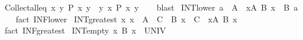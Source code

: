 \begin{isabellebody}
\isamarkupfalse%
\ Collect{\isacharunderscore}{\kern0pt}all{\isacharunderscore}{\kern0pt}eq{\isacharcolon}{\kern0pt}\ {\isachardoublequoteopen}{\isacharbraceleft}{\kern0pt}x{\isachardot}{\kern0pt}\ {\isasymforall}y{\isachardot}{\kern0pt}\ P\ x\ y{\isacharbraceright}{\kern0pt}\ {\isacharequal}{\kern0pt}\ {\isacharparenleft}{\kern0pt}{\isasymInter}y{\isachardot}{\kern0pt}\ {\isacharbraceleft}{\kern0pt}x{\isachardot}{\kern0pt}\ P\ x\ y{\isacharbraceright}{\kern0pt}{\isacharparenright}{\kern0pt}{\isachardoublequoteclose}\isanewline
%
\isadelimproof
\ \ %
\endisadelimproof
%
\isatagproof
{}\isamarkupfalse%
\ blast%
\endisatagproof
{\isafoldproof}%
%
\isadelimproof
\isanewline
%
\endisadelimproof
\isanewline
{}\isamarkupfalse%
\ INT{\isacharunderscore}{\kern0pt}lower{\isacharcolon}{\kern0pt}\ {\isachardoublequoteopen}a\ {\isasymin}\ A\ {\isasymLongrightarrow}\ {\isacharparenleft}{\kern0pt}{\isasymInter}x{\isasymin}A{\isachardot}{\kern0pt}\ B\ x{\isacharparenright}{\kern0pt}\ {\isasymsubseteq}\ B\ a{\isachardoublequoteclose}\isanewline
%
\isadelimproof
\ \ %
\endisadelimproof
%
\isatagproof
{}\isamarkupfalse%
\ {\isacharparenleft}{\kern0pt}fact\ INF{\isacharunderscore}{\kern0pt}lower{\isacharparenright}{\kern0pt}%
\endisatagproof
{\isafoldproof}%
%
\isadelimproof
\isanewline
%
\endisadelimproof
\isanewline
{}\isamarkupfalse%
\ INT{\isacharunderscore}{\kern0pt}greatest{\isacharcolon}{\kern0pt}\ {\isachardoublequoteopen}{\isacharparenleft}{\kern0pt}{\isasymAnd}x{\isachardot}{\kern0pt}\ x\ {\isasymin}\ A\ {\isasymLongrightarrow}\ C\ {\isasymsubseteq}\ B\ x{\isacharparenright}{\kern0pt}\ {\isasymLongrightarrow}\ C\ {\isasymsubseteq}\ {\isacharparenleft}{\kern0pt}{\isasymInter}x{\isasymin}A{\isachardot}{\kern0pt}\ B\ x{\isacharparenright}{\kern0pt}{\isachardoublequoteclose}\isanewline
%
\isadelimproof
\ \ %
\endisadelimproof
%
\isatagproof
{}\isamarkupfalse%
\ {\isacharparenleft}{\kern0pt}fact\ INF{\isacharunderscore}{\kern0pt}greatest{\isacharparenright}{\kern0pt}%
\endisatagproof
{\isafoldproof}%
%
\isadelimproof
\isanewline
%
\endisadelimproof
\isanewline
{}\isamarkupfalse%
\ INT{\isacharunderscore}{\kern0pt}empty{\isacharcolon}{\kern0pt}\ {\isachardoublequoteopen}{\isacharparenleft}{\kern0pt}{\isasymInter}x{\isasymin}{\isacharbraceleft}{\kern0pt}{\isacharbraceright}{\kern0pt}{\isachardot}{\kern0pt}\ B\ x{\isacharparenright}{\kern0pt}\ {\isacharequal}{\kern0pt}\ UNIV{\isachardoublequoteclose}\isanewline
%
\isadelimproof
\ \ %
\endisadelimproof
%
\isatagproof
{}\isamarkupfalse%

\end{isabellebody}
